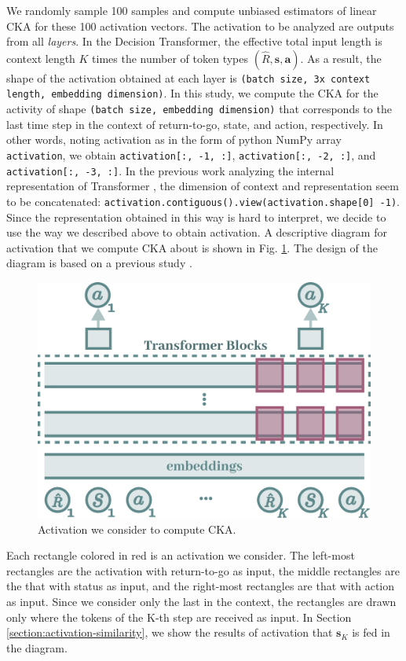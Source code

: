 \documentclass{article}
\begin{document}
We randomly sample 100 samples and compute unbiased estimators \cite{kornblith2019similarity} of linear CKA for these 100 activation vectors. The activation to be analyzed are outputs from all \textit{layers}.
In the Decision Transformer, the effective total input length is context length $K$ times the number of token types $(\hat{R}, \bm{s}, \bm{a})$. As a result, the shape of the activation obtained at each layer is \lstinline{(batch size, 3x context length, embedding dimension)}. In this study, we compute the CKA for the activity of shape \lstinline{(batch size, embedding dimension)} that corresponds to the last time step in the context of return-to-go, state, and action, respectively. In other words, noting activation as in the form of python NumPy array \lstinline{activation}, we obtain \lstinline{activation[:, -1, :]}, \lstinline{activation[:, -2, :]}, and \lstinline{activation[:, -3, :]}. 
In the previous work analyzing the internal representation of Transformer \cite{wu-etal-2020-similarity}, the dimension of context and representation seem to be concatenated:  \lstinline{activation.contiguous().view(activation.shape[0] -1)}. Since the representation obtained in this way is hard to interpret, we decide to use the way we described above to obtain activation. A descriptive diagram for activation that we compute CKA about is shown in Fig. \ref{fig:diagram_cka_activation}. The design of the diagram is based on a previous study \cite{chen2021decision}. 

\begin{figure}[H]
    \centering
    \includegraphics[width=0.5\linewidth]{figs/cka_activation.pdf}
    \caption{Activation we consider to compute CKA.}
    \label{fig:diagram_cka_activation}
\end{figure}

Each rectangle colored in red is an activation we consider. The left-most rectangles are the activation with return-to-go as input, the middle rectangles are the that with status as input, and the right-most rectangles are that with action as input. Since we consider only the last in the context, the rectangles are drawn only where the tokens of the K-th step are received as input. In Section \ref{section:activation-similarity}, we show the results of activation that $\bm{s}_K$ is fed in the diagram.
\end{document}
